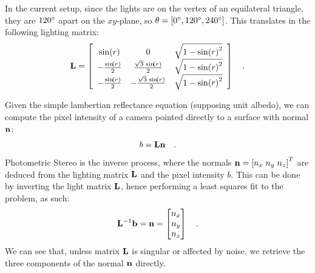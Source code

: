 \documentclass{report}
\begin{document}
In the current setup, since the lights are on the vertex of an equilateral triangle, they are $120\degree$ apart on the $xy$-plane, so $\theta = \left[ 0\degree, 120\degree, 240\degree \right]$. This translates in the following lighting matrix:
\begin{equation}
\B{L} =
\left[\begin{array}{ccc} \sin\!\left(r\right) & 0 & \sqrt{1 - {\sin\!\left(r\right)}^2}\\ -\frac{\sin\!\left(r\right)}{2} & \frac{\sqrt{3}\, \sin\!\left(r\right)}{2} & \sqrt{1 - {\sin\!\left(r\right)}^2}\\ -\frac{\sin\!\left(r\right)}{2} & -\frac{\sqrt{3}\, \sin\!\left(r\right)}{2} & \sqrt{1 - {\sin\!\left(r\right)}^2} \end{array}\right]
\quad .
\end{equation}

Given the simple lambertian reflectance equation (supposing unit albedo), we can compute the pixel intensity of a camera pointed directly to a surface with normal $\mathbf{n}$:
\begin{equation}
b = \mathbf{L}\mathbf{n}
\quad.
\end{equation}
Photometric Stereo is the inverse process, where the normals $\mathbf{n} = \left[ n_x \; n_y \; n_z\right]^T$ are deduced from the lighting matrix $\mathbf{L}$ and the pixel intensity $b$. This can be done by inverting the light matrix $\mathbf{L}$, hence performing a least squares fit to the problem, as such:
\begin{equation}
\mathbf{L}^{-1}\mathbf{b} = \mathbf{n} = 
\begin{bmatrix}
n_x \\
n_y \\
n_z 
\end{bmatrix}
\quad.
\end{equation}
We can see that, unless matrix $\mathbf{L}$ is singular or affected by noise, we retrieve the three components of the normal $\mathbf{n}$ directly.
\end{document}
